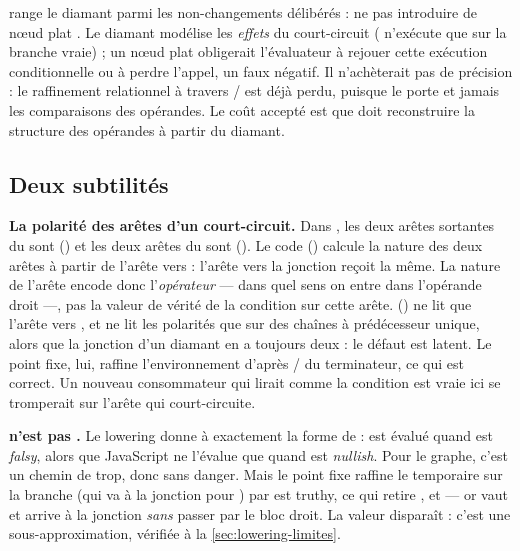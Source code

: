 \begin{decision}
 range le diamant parmi les \og non-changements délibérés\fg{} : ne pas introduire de nœud plat . Le diamant modélise les \emph{effets} du court-circuit ( n'exécute  que sur la branche vraie) ; un nœud plat obligerait l'évaluateur à rejouer cette exécution conditionnelle ou à perdre l'appel, un faux négatif. Il n'achèterait pas de précision : le raffinement relationnel à travers \code{&&}/\code{||} est déjà perdu, puisque le  porte  et jamais les comparaisons des opérandes. Le coût accepté est que  doit reconstruire la structure des opérandes à partir du diamant.
\end{decision}

\subsection{Deux subtilités}

\begin{piege}
\textbf{La polarité des arêtes d'un court-circuit.} Dans , les deux arêtes sortantes du  sont  () et les deux arêtes du \code{&&} sont  (). Le code () calcule la nature des deux arêtes à partir de l'arête vers  : l'arête vers la jonction reçoit la même. La nature de l'arête encode donc l'\emph{opérateur} --- dans quel sens on entre dans l'opérande droit ---, pas la valeur de vérité de la condition sur cette arête.  () ne lit que l'arête vers , et  ne lit les polarités que sur des chaînes à prédécesseur unique, alors que la jonction d'un diamant en a toujours deux : le défaut est latent. Le point fixe, lui, raffine l'environnement d'après / du terminateur, ce qui est correct. Un nouveau consommateur qui lirait  comme \og la condition est vraie ici\fg{} se tromperait sur l'arête qui court-circuite.
\end{piege}

\begin{piege}
\textbf{ n'est pas \code{||}.} Le lowering donne à  exactement la forme de  :  est évalué quand  est \emph{falsy}, alors que JavaScript ne l'évalue que quand  est \emph{nullish}. Pour le graphe, c'est un chemin de trop, donc sans danger. Mais le point fixe raffine le temporaire sur la branche  (qui va à la jonction pour ) par \og {} est truthy\fg{}, ce qui retire ,  et  --- or  vaut  et arrive à la jonction \emph{sans} passer par le bloc droit. La valeur  disparaît : c'est une sous-approximation, vérifiée à la \cref{sec:lowering-limites}.
\end{piege}


